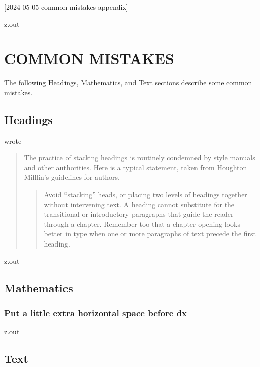 [2024-05-05 common mistakes appendix]

\begin{VerbatimOut}{z.out}
\chapter{COMMON MISTAKES}

The following Headings, Mathematics, and Text
sections describe some common mistakes.




\section{Headings}

\textcite[page~289]{farkas2011}
wrote

\begin{quotation}
  The practice of stacking headings
  is routinely condemned by style manuals
  and other authorities.
  Here is a typical statement,
  taken from Houghton Mifflin's guidelines for authors.
  \begin{quotation}
    Avoid ``stacking'' heads,
    or placing two levels
    of headings together without intervening text.
    A heading cannot substitute
    for the transitional
    or introductory paragraphs
    that guide the reader through a chapter.
    Remember too that a chapter opening looks better in type
    when one
    or more paragraphs
    of text precede the first heading.
  \end{quotation}
\end{quotation}
\end{VerbatimOut}

\MyIO


\begin{VerbatimOut}{z.out}


\section{Mathematics}

\subsection{Put a little extra horizontal space before dx}
\end{VerbatimOut}
\MyIO


\begin{VerbatimOut}{z.out}


\section{Text}
\end{VerbatimOut}

